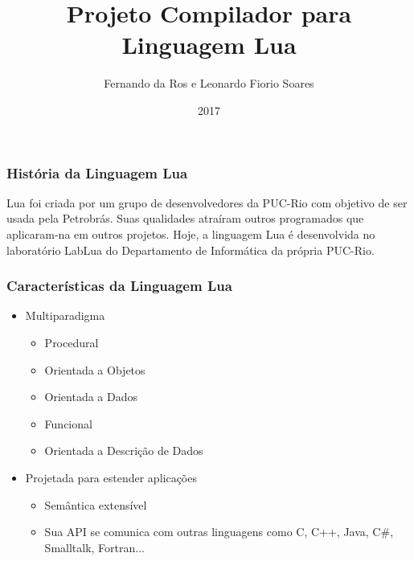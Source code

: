 \documentclass{beamer}
\title{Projeto Compilador para Linguagem Lua}
\author{Fernando da Ros e Leonardo Fiorio Soares}
\institute[Universidade Federal Fluminense]
\date{2017}
\begin{document}
\begin{frame}
  \titlepage
\end{frame}



\begin{frame}
        \frametitle{Hist\'oria da Linguagem Lua}
        
        Lua foi criada por um grupo de desenvolvedores da PUC-Rio com objetivo de ser usada pela Petrobrás. Suas qualidades atraíram outros programados que aplicaram-na em outros projetos. Hoje, a linguagem Lua é desenvolvida no laboratório LabLua do Departamento de Informática da pr\'opria PUC-Rio.
\end{frame}




\begin{frame}
    \frametitle{Caracter\'isticas da Linguagem Lua}
    
    \begin{itemize}
    \item Multiparadigma
    
         \begin{itemize}
    
            \item Procedural
            \item Orientada a Objetos
            \item Orientada a Dados
            \item Funcional 
            \item Orientada a Descrição de Dados            
    
         \end{itemize}
         
    \end{itemize}
    
    \begin{itemize}
             \item Projetada para estender aplica\c{c}\~oes
                \begin{itemize}
                    \item Sem\^antica extens\'ivel
                    \item Sua API se comunica com outras linguagens como C, C++, Java, C#, Smalltalk, Fortran...
                \end{itemize}        
    
        
     \end{itemize}
    
\end{frame}
\end{document}

